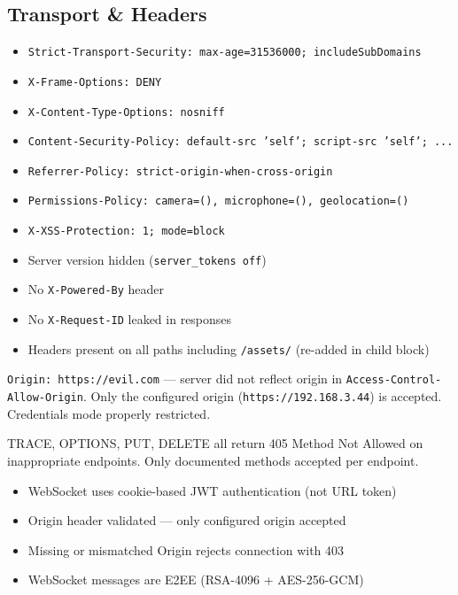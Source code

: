\documentclass[11pt,a4paper]{article}
\begin{document}
\subsection{Transport \& Headers}

\begin{tcolorbox}[colback=pass!5, colframe=pass, title=\textbf{Security Headers --- PASS (10/10)}]
\begin{itemize}[nosep]
  \item \texttt{Strict-Transport-Security: max-age=31536000; includeSubDomains}
  \item \texttt{X-Frame-Options: DENY}
  \item \texttt{X-Content-Type-Options: nosniff}
  \item \texttt{Content-Security-Policy: default-src 'self'; script-src 'self'; ...}
  \item \texttt{Referrer-Policy: strict-origin-when-cross-origin}
  \item \texttt{Permissions-Policy: camera=(), microphone=(), geolocation=()}
  \item \texttt{X-XSS-Protection: 1; mode=block}
  \item Server version hidden (\texttt{server\_tokens off})
  \item No \texttt{X-Powered-By} header
  \item No \texttt{X-Request-ID} leaked in responses
  \item Headers present on all paths including \texttt{/assets/} (re-added in child block)
\end{itemize}
\end{tcolorbox}

\begin{tcolorbox}[colback=pass!5, colframe=pass, title=\textbf{CORS Validation --- PASS}]
\texttt{Origin: https://evil.com} --- server did not reflect origin in \texttt{Access-Control-Allow-Origin}. Only the configured origin (\texttt{https://192.168.3.44}) is accepted. Credentials mode properly restricted.
\end{tcolorbox}

\begin{tcolorbox}[colback=pass!5, colframe=pass, title=\textbf{HTTP Method Restriction --- PASS}]
TRACE, OPTIONS, PUT, DELETE all return 405 Method Not Allowed on inappropriate endpoints. Only documented methods accepted per endpoint.
\end{tcolorbox}

\begin{tcolorbox}[colback=pass!5, colframe=pass, title=\textbf{WebSocket Security (CSWSH) --- PASS}]
\begin{itemize}[nosep]
  \item WebSocket uses cookie-based JWT authentication (not URL token)
  \item Origin header validated --- only configured origin accepted
  \item Missing or mismatched Origin rejects connection with 403
  \item WebSocket messages are E2EE (RSA-4096 + AES-256-GCM)
\end{itemize}
\end{tcolorbox}
\end{document}
